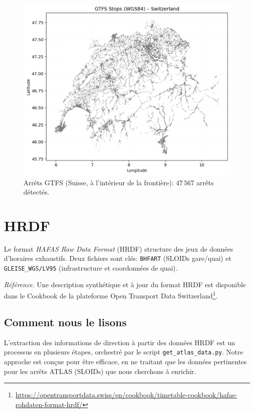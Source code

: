 \begin{figure}[h]
  \centering
  \includegraphics[width=.76\linewidth]{figures/plots/gtfs_points_switzerland.png}
  \caption[Arrêts GTFS (Suisse)]{Arrêts GTFS (Suisse, à l'intérieur de la frontière): \(47\,567\) arrêts détectés.}
  \label{fig:gtfs_ch_points}
\end{figure}




\vspace{.2em}

\section{HRDF}
Le format \textit{HAFAS Raw Data Format} (HRDF) structure des jeux de données d'horaires exhaustifs. Deux fichiers sont clés: \texttt{BHFART} (SLOIDs gare/quai) et \texttt{GLEISE\_WGS/LV95} (infrastructure et coordonnées de quai).

\noindent\textit{Référence.} Une description synthétique et à jour du format HRDF est disponible dans le Cookbook de la plateforme Open Transport Data Switzerland\footnote{\url{https://opentransportdata.swiss/en/cookbook/timetable-cookbook/hafas-rohdaten-format-hrdf/}}.

\subsection{Comment nous le lisons}
L'extraction des informations de direction à partir des données HRDF est un processus en plusieurs étapes, orchestré par le script \texttt{get\_atlas\_data.py}. Notre approche est conçue pour être efficace, en ne traitant que les données pertinentes pour les arrêts ATLAS (SLOIDs) que nous cherchons à enrichir.

